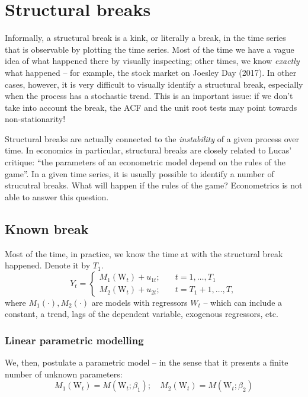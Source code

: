 \documentclass[11pt, a4paper]{report}
\theoremstyle{plain}
\theoremstyle{plain}
\theoremstyle{remark}
\begin{document}
\chapter{Structural breaks}


Informally, a structural break is a kink, or literally a break, in the time series that is observable by plotting the time series. Most of the time we have a vague idea of what happened there by visually inspecting; other times, we know \textit{exactly} what happened -- for example, the stock market on Joesley Day (2017). In other cases, however, it is very difficult to visually identify a structural break, especially when the process has a stochastic trend. This is an important issue: if we don't take into account the break, the ACF and the unit root tests may point towards non-stationarity!

Structural breaks are actually connected to the \textit{instability} of a given process over time. In economics in particular, structural breaks are closely related to Lucas' critique: ``the parameters of an econometric model depend on the rules of the game''. In a given time series, it is usually possible to identify a number of strucutral breaks. What will happen if the rules of the game? Econometrics is not able to answer this question. 

\section{Known break}

Most of the time, in practice, we know the time at with the structural break happened. Denote it by $T_1$. 
$$Y_{t}=\left\{\begin{array}{ll}
M_{1}\left(\mathrm{{W}}_{t}\right)+u_{1 t} ; & t=1, \ldots, T_{1} \\
M_{2}\left(\mathrm{W}_{t}\right)+u_{2 t} ; \quad & t=T_{1}+1, \ldots, T,
\end{array}\right.$$
where $M_1(\cdot), M_2(\cdot)$ are models with regressors $W_t$ -- which can include a constant, a trend, lags of the dependent variable, exogenous regressors, etc.

\subsection{Linear parametric modelling}

We, then, postulate a parametric model -- in the sense that it presents a finite number of unknown parameters:
$$M_{1}\left(\mathrm{W}_{t}\right)=M\left({\mathrm{W}}_{t} ; {\beta}_{1}\right) ; \quad M_{2}\left(\mathrm{W}_{t}\right)=M\left(\mathrm{W}_{t} ; {\beta}_{2}\right)$$
\end{document}
